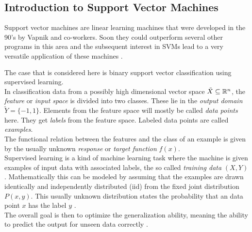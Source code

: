
\subsection{Introduction to Support Vector Machines}
Support vector machines are linear learning machines that were developed in the 90's by Vapnik and co-workers. Soon they could outperform several other programs in this area \cite{Cristianini2000} and the subsequent interest in SVMs lead to a very versatile application of these machines \cite{Kunapuli2008}.

The case that is considered here is binary support vector classification using supervised learning. \\
In classification data from a possibly high dimensional vector space \(\tilde{X} \subseteq \mathbb{R}^n\), the \emph{feature} or \emph{input space} is divided into two classes. These lie in the \emph{output domain} \(\tilde{Y} = \{-1,1\}\). Elements from the feature space will mostly be called \emph{data points} here. They get \emph{labels} from the feature space. Labeled data points are called \emph{examples}. \\
The functional relation between the features and the class of an example is given by the usually unknown \emph{response} or \emph{target function} \(f(x)\). \\
Supervised learning is a kind of machine learning task where the machine is given examples of input data with associated labels, the so called \emph{training data} \((X,Y)\). Mathematically this can be modeled by assuming that the examples are  drawn identically and independently distributed (iid) from the fixed joint distribution \(P(x,y)\). This usually unknown distribution states the probability that an data point \(x\) has the label \(y\) \cite{Vapnik1999}. \\
The overall goal is then to optimize the generalization ability, meaning the ability to predict the output for unseen data correctly \cite{Cristianini2000}.

